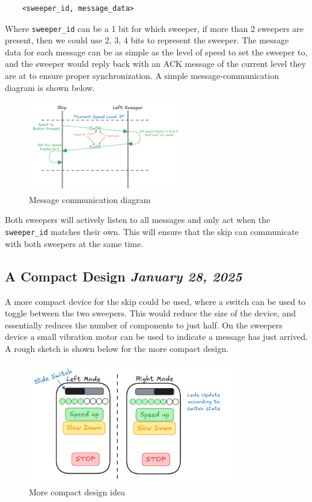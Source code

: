 \documentclass{article}
\newcommand{\logbookentry}[2]{
    \subsection*{#1 \hfill \textit{#2}} 
}
\begin{document}
\begin{verbatim}
    <sweeper_id, message_data>
\end{verbatim}
Where \texttt{sweeper\_id} can be a 1 bit for which sweeper, if more than 2 sweepers are present, then we could use 2, 3, 4 bits to represent the sweeper. The message data for each message can be as simple as the level of speed to set the sweeper to, and the sweeper would reply back with an ACK message of the current level they are at to ensure proper synchronization. A simple message-communication diagram is shown below.

\begin{figure}[ht!]
    \centering
    \includegraphics[width=0.6\textwidth]{message_structure_idea.png}
    \caption{Message communication diagram}
\end{figure}

Both sweepers will actively listen to all messages and only act when the \texttt{sweeper\_id} matches their own. This will ensure that the skip can communicate with both sweepers at the same time.

\logbookentry{A Compact Design}{January 28, 2025}
A more compact device for the skip could be used, where a switch can be used to toggle between the two sweepers. This would reduce the size of the device, and essentially reduces the number of components to just half. On the sweepers device a small vibration motor can be used to indicate a message has just arrived. A rough sketch is shown below for the more compact design.
\begin{figure}[ht!]
    \centering
    \includegraphics[width=0.8\textwidth]{design_idea2.png}
    \caption{More compact design idea}
\end{figure}
\end{document}
